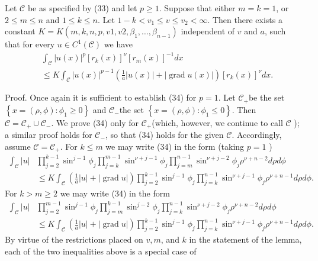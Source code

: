 \begin{lemma}
  Let $\mathcal{C}$ be as specified by (33) and let $p \geq 1$. Suppose that either $m=k=1$, or $2 \leq m \leq n$ and $1 \leq k \leq n$. Let $1-k<v_1 \leq v \leq v_2<\infty$. Then there exists a constant $K=K\left(m, k, n, p, v 1, v 2, \beta_1, \ldots, \beta_{n-1}\right)$ independent of $v$ and $a$, such that for every $u \in C^1(\mathcal{C})$ we have
  \[
  \begin{aligned}
  & \int_{\mathcal{C}}|u(x)|^p\left[r_k(x)\right]^\nu\left[r_m(x)\right]^{-1} d x \\
  & \leq K \int_{\mathcal{C}}|u(x)|^{p-1}\left(\frac{1}{a}|u(x)|+|\operatorname{grad} u(x)|\right)\left[r_k(x)\right]^\nu d x .
  \end{aligned}
  \]
\end{lemma}
Proof. Once again it is sufficient to establish (34) for $p=1$. Let $\mathcal{C}_{+}$be the set $\left\{x=(\rho, \phi): \phi_1 \geq 0\right\}$ and $\mathcal{C}_{-}$the set $\left\{x=(\rho, \phi): \phi_1 \leq 0\right\}$. Then $\mathcal{C}=\mathcal{C}_{+} \cup \mathcal{C}_{-}$. We prove (34) only for $\mathcal{C}_{+}$(which, however, we continue to call $\mathcal{C}$ ); a similar proof holds for $\mathcal{C}_{-}$, so that (34) holds for the given $\mathcal{C}$. Accordingly, assume $\mathcal{C}=\mathcal{C}_{+}$.
For $k \leq m$ we may write (34) in the form (taking $p=1$ )
\[
\begin{aligned}
\int_{\mathcal{C}}|u| & \prod_{j=2}^{k-1} \sin ^{j-1} \phi_j \prod_{j=k}^{m-1} \sin ^{\nu+j-1} \phi_j \prod_{j=m}^{n-1} \sin ^{\nu+j-2} \phi_j \rho^{\nu+n-2} d \rho d \phi \\
& \leq K \int_{\mathcal{C}}\left(\frac{1}{a}|u|+|\operatorname{grad} u|\right) \prod_{j=2}^{k-1} \sin ^{j-1} \phi_j \prod_{j=k}^{n-1} \sin ^{\nu+j-1} \phi_j \rho^{\nu+n-1} d \rho d \phi .
\end{aligned}
\]
For $k>m \geq 2$ we may write (34) in the form
\[
\begin{aligned}
\int_{\mathcal{C}}|u| & \prod_{j=2}^{m-1} \sin ^{j-1} \phi_j \prod_{j=m}^{k-1} \sin ^{j-2} \phi_j \prod_{j=k}^{n-1} \sin ^{\nu+j-2} \phi_j \rho^{\nu+n-2} d \rho d \phi \\
& \leq K \int_{\mathcal{C}}\left(\frac{1}{a}|u|+|\operatorname{grad} u|\right) \prod_{j=2}^{k-1} \sin ^{j-1} \phi_j \prod_{j=k}^{n-1} \sin ^{\nu+j-1} \phi_j \rho^{\nu+n-1} d \rho d \phi .
\end{aligned}
\]
By virtue of the restrictions placed on $v, m$, and $k$ in the statement of the lemma, each of the two inequalities above is a special case of
